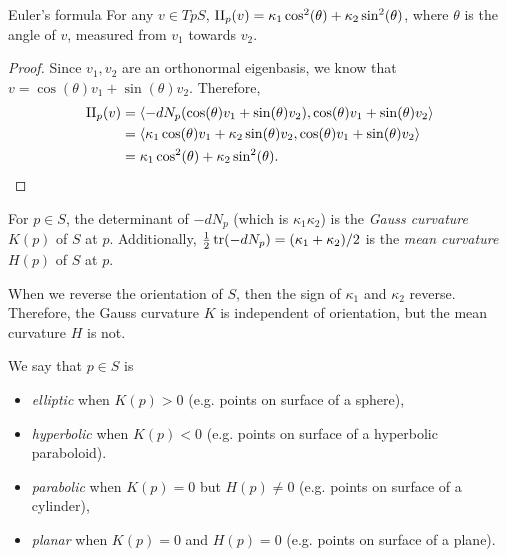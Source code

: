 \begin{thm}{Euler's formula}\proofbreak
    For any $v \in TpS$, $\operatorname{II}_p(v) = \kappa_1\cos^2(\theta) + \kappa_2\sin^2(\theta)$, where $\theta$ is the angle of $v$, measured from $v_1$ towards $v_2$.
\end{thm}

\begin{proof}
    Since $v_1, v_2$ are an orthonormal eigenbasis, we know that $v = \cos(\theta)v_1 + \sin(\theta)v_2$. Therefore,
    \begin{align*}
        \operatorname{II}_p(v) &= \langle -dN_p(\cos(\theta)v_1 + \sin(\theta)v_2), \cos(\theta)v_1 + \sin(\theta)v_2 \rangle \\
        &= \langle \kappa_1\cos(\theta)v_1 + \kappa_2\sin(\theta)v_2, \cos(\theta)v_1 + \sin(\theta)v_2 \rangle \\
        &= \kappa_1\cos^2(\theta) + \kappa_2\sin^2(\theta).
    \end{align*}
\end{proof}

\begin{defn}
    For $p \in S$, the determinant of $-dN_p$ (which is $\kappa_1\kappa_2$) is the \emph{Gauss curvature} $K(p)$ of $S$ at $p$. Additionally, $\frac{1}{2}\operatorname{tr}(-dN_p) = (\kappa_1 + \kappa_2)/2$ is the \emph{mean curvature} $H(p)$ of $S$ at $p$.
\end{defn}

\begin{rmk}
    When we reverse the orientation of $S$, then the sign of $\kappa_1$ and $\kappa_2$ reverse. Therefore, the Gauss curvature $K$ is independent of orientation, but the mean curvature $H$ is not.
\end{rmk}

\begin{defn}
    We say that $p \in S$ is
    \begin{itemize}
        \item \emph{elliptic} when $K(p) > 0$ (e.g. points on surface of a sphere),
        \item \emph{hyperbolic} when $K(p) < 0$ (e.g. points on surface of a hyperbolic paraboloid).
        \item \emph{parabolic} when $K(p) = 0$ but $H(p) \neq 0$ (e.g. points on surface of a cylinder),
        \item \emph{planar} when $K(p) = 0$ and $H(p) = 0$ (e.g. points on surface of a plane).
    \end{itemize}
\end{defn}

